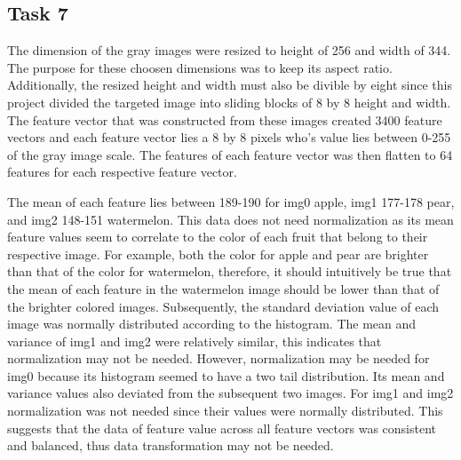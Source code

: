 \documentclass{article}
\begin{document}
\begin{multicols}{2}
	\section{Task 7}
		\setlength{\parindent}{10ex}
		The dimension of the gray images were resized 
		to height of 256 and width of 344. 
		The purpose for these choosen dimensions was to keep 
		its aspect ratio. Additionally, the resized height and 
		width must also be divible by eight since this project 
		divided the targeted image into sliding blocks of 8 by 8 
		height and width. The feature vector that was constructed 
		from these images created 3400 feature vectors and each 
		feature vector lies a 8 by 8 pixels who's value lies 
		between 0-255 of the gray image scale. 
		The features of each feature vector was then flatten to 
		64 features for each respective feature vector. 
		
		\setlength{\parindent}{10ex}
		The mean of each feature lies between 189-190 for
		img0 apple, img1 177-178 pear, and img2 148-151 watermelon.
		This data does not need normalization as its mean feature 
		values seem to correlate to the color of each fruit that 
		belong to their respective image. For example, 
		both the color for apple and pear are brighter than 
		that of the color for watermelon, therefore, it should 
		intuitively be true that the mean of each feature in the 
		watermelon image should be lower than that of the brighter 
		colored images. Subsequently, 
		the standard deviation value of each image was 
		normally distributed according to the histogram.
		The mean and variance of img1 and img2 were relatively 
		similar, this indicates that normalization may not be needed. 
		However, normalization may be needed for img0 because its 
		histogram seemed to have a two tail distribution. Its mean and 
		variance values also deviated from the subsequent two images. 
		For img1 and img2 normalization was not 
		needed since their values were normally distributed. 
		This suggests that the data of feature value across 
		all feature vectors was consistent and balanced, 
		thus data transformation may not be needed.  
	

\end{multicols}
\end{document}
